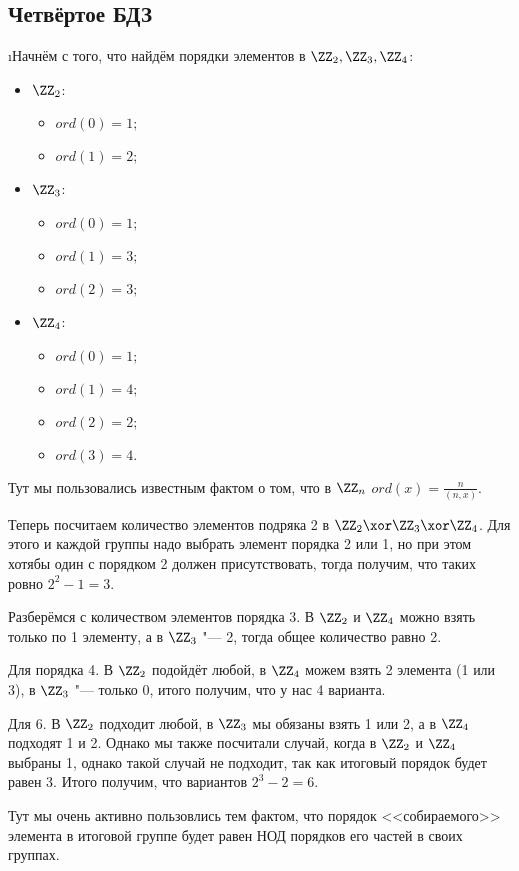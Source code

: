 \subsection{Четвёртое БДЗ}


\i Начнём с того, что найдём порядки элементов в $\ZZ_2, \ZZ_3, \ZZ_4$:
\begin{itemize}
    \item $\ZZ_2$:
    \begin{itemize}
        \item $ord(0) = 1;$
        \item $ord(1) = 2;$
    \end{itemize}
    \item $\ZZ_3$:
    \begin{itemize}
        \item $ord(0) = 1;$
        \item $ord(1) = 3;$
        \item $ord(2) = 3;$
    \end{itemize}
    \item $\ZZ_4$:
    \begin{itemize}
        \item $ord(0) = 1;$
        \item $ord(1) = 4;$
        \item $ord(2) = 2;$
        \item $ord(3) = 4.$
    \end{itemize}
\end{itemize}
Тут мы пользовались известным фактом о том, что в $\ZZ_n$ $ord(x) = \frac{n}{(n, x)}$.
\par Теперь посчитаем количество элементов подряка 2 в $\ZZ_2 \xor \ZZ_3 \xor \ZZ_4$. Для этого и каждой группы надо выбрать элемент порядка 2 или 1, но при этом хотябы один с порядком 2 должен присутствовать, тогда получим, что таких ровно $2^2 - 1 = 3$.
\par Разберёмся с количеством элементов порядка 3. В $\ZZ_2$ и $\ZZ_4$ можно взять только по 1 элементу, а в $\ZZ_3$ "--- 2, тогда общее количество равно 2.
\par Для порядка 4. В $\ZZ_2$ подойдёт любой, в $\ZZ_4$ можем взять 2 элемента (1 или 3), в $\ZZ_3$ "--- только 0, итого получим, что у нас 4 варианта.
\par Для 6. В $\ZZ_2$ подходит любой, в $\ZZ_3$ мы обязаны взять 1 или 2, а в $\ZZ_4$ подходят 1 и 2. Однако мы также посчитали случай, когда в $\ZZ_2$ и $\ZZ_4$ выбраны 1, однако такой случай не подходит, так как итоговый порядок будет равен 3. Итого получим, что вариантов $2^3 - 2 = 6$.
\par Тут мы очень активно пользовлись тем фактом, что порядок <<собираемого>> элемента в итоговой группе будет равен НОД порядков его частей в своих группах.


